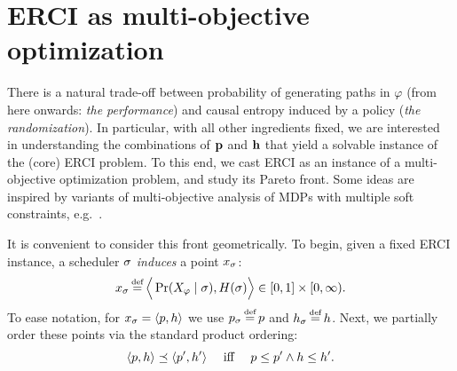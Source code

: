 \section{ERCI as multi-objective optimization}\label{sec:convex}
There is a natural trade-off
between probability of generating paths in $\varphi$ (from here
onwards: \emph{the performance}) and causal entropy induced by a
policy (\emph{the randomization}).  In particular, with all other ingredients fixed, 
we are interested in understanding the combinations of $\mathbf{p}$
and $\mathbf{h}$ that yield a solvable instance of the (core) ERCI problem. To this
end, we cast ERCI as an instance of a multi-objective optimization problem, and
study its Pareto front. Some ideas are inspired by variants of multi-objective analysis of MDPs with multiple soft constraints, e.g.~\cite{DBLP:conf/stacs/ChatterjeeMH06,DBLP:conf/tacas/EtessamiKVY07}.


It is convenient to consider this front geometrically.
To begin, given a fixed ERCI instance, a scheduler $\sigma$
\emph{induces} a point $x_\sigma$:
\begin{equation}
  x_\sched \eqdef \Big\langle \Pr(X_\varphi \mid \sched), H(\sched) \Big\rangle \in [0,1] \times [0,\infty).  
\end{equation}
To ease notation, for $x_\sigma = \langle p,h \rangle$ we use
$\scp_\sched \eqdef \scp$ and $\rndp_\sched \eqdef \rndp$. Next, we
partially order these points via the standard product ordering:
\begin{equation}
  \langle p,h \rangle \preceq \langle p',h' \rangle \quad\text{ iff }\quad p \leq p' \wedge h \leq h'.
\end{equation}

